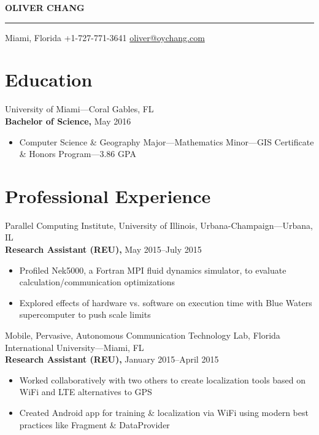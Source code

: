 \documentclass[letterpaper,12pt]{article}
\def\name{Oliver Chang}
\begin{document}
{\centering
  \Huge
    \textbf{\MakeUppercase{\name}}\\
}

\vskip 3mm
\hrule
\vskip 1mm

{\centering
  \normalsize
    \null\hfill%
      Miami, Florida \hfill
      +1-727-771-3641 \hfill
      \href{mailto:oliver@oychang.com}{oliver@oychang.com}
    \hfill\null\\
}

\section*{Education}
University of Miami---Coral Gables, FL\\
\textbf{Bachelor of Science,} May 2016
\begin{itemize}
    \item Computer Science \& Geography Major---Mathematics Minor---GIS Certificate \& Honors Program---3.86 GPA
\end{itemize}

\vskip 3mm

\section*{Professional Experience}

Parallel Computing Institute, University of Illinois, Urbana-Champaign---Urbana, IL\\
\textbf{Research Assistant (REU),} May 2015--July 2015
\begin{itemize}
  \item Profiled Nek5000, a Fortran MPI fluid dynamics simulator, to evaluate calculation/communication optimizations
  \item Explored effects of hardware vs. software on execution time with Blue Waters supercomputer to push scale limits
\end{itemize}

\vskip 1.5mm

Mobile, Pervasive, Autonomous Communication Technology Lab, Florida International University---Miami, FL\\
\textbf{Research Assistant (REU),} January 2015--April 2015
\begin{itemize}
  \item Worked collaboratively with two others to create localization tools based on WiFi and LTE alternatives to GPS
  \item Created Android app for training \& localization via WiFi using modern best practices like Fragment \& DataProvider
\end{itemize}
\end{document}

